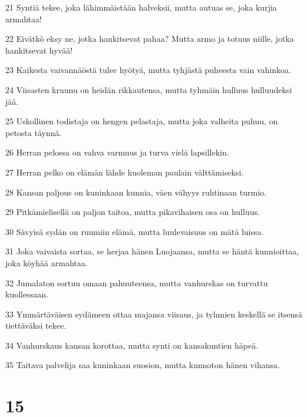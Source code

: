 \par 21 Syntiä tekee, joka lähimmäistään halveksii, mutta autuas se, joka kurjia armahtaa!
\par 22 Eivätkö eksy ne, jotka hankitsevat pahaa? Mutta armo ja totuus niille, jotka hankitsevat hyvää!
\par 23 Kaikesta vaivannäöstä tulee hyötyä, mutta tyhjästä puheesta vain vahinkoa.
\par 24 Viisasten kruunu on heidän rikkautensa, mutta tyhmäin hulluus hulluudeksi jää.
\par 25 Uskollinen todistaja on hengen pelastaja, mutta joka valheita puhuu, on petosta täynnä.
\par 26 Herran pelossa on vahva varmuus ja turva vielä lapsillekin.
\par 27 Herran pelko on elämän lähde kuoleman paulain välttämiseksi.
\par 28 Kansan paljous on kuninkaan kunnia, väen vähyys ruhtinaan turmio.
\par 29 Pitkämielisellä on paljon taitoa, mutta pikavihaisen osa on hulluus.
\par 30 Sävyisä sydän on ruumiin elämä, mutta luulevaisuus on mätä luissa.
\par 31 Joka vaivaista sortaa, se herjaa hänen Luojaansa, mutta se häntä kunnioittaa, joka köyhää armahtaa.
\par 32 Jumalaton sortuu omaan pahuuteensa, mutta vanhurskas on turvattu kuollessaan.
\par 33 Ymmärtäväisen sydämeen ottaa majansa viisaus, ja tyhmien keskellä se itsensä tiettäväksi tekee.
\par 34 Vanhurskaus kansan korottaa, mutta synti on kansakuntien häpeä.
\par 35 Taitava palvelija saa kuninkaan suosion, mutta kunnoton hänen vihansa.

\chapter{15}

